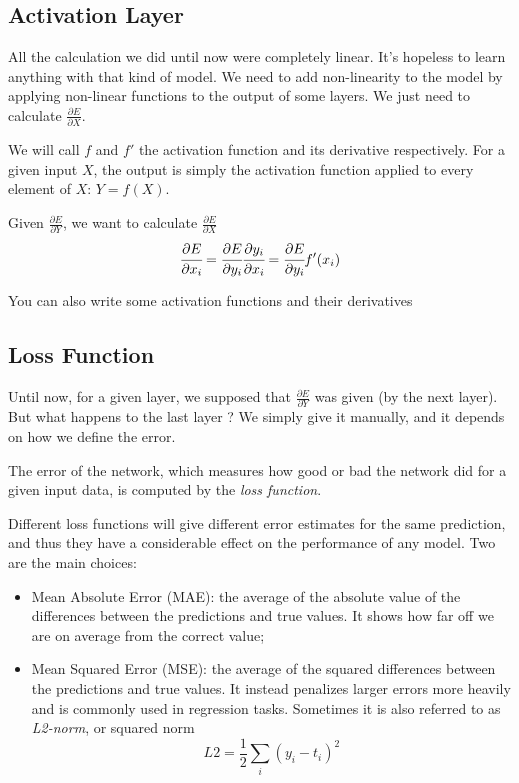 \subsection{Activation Layer}
All the calculation we did until now were completely linear. It's hopeless to learn anything with that kind of model. We need to add non-linearity to the model by applying non-linear functions to the output of some layers. We just need to calculate $\frac{\partial E}{\partial X}$.

We will call $f$ and $f'$ the activation function and its derivative respectively. For a given input $X$, the output is simply the activation function applied to every element of $X$: $Y = f(X)$. 

Given $\frac{\partial E}{\partial Y}$, we want to calculate $\frac{\partial E}{\partial X}$
\begin{equation}
	\cfrac{\partial E}{\partial x_i} = \cfrac{\partial E}{\partial y_i}\cfrac{\partial y_i}{\partial x_i} = \cfrac{\partial E}{\partial y_i} f'(x_i) 
\end{equation}


You can also write some activation functions and their derivatives


\subsection{Loss Function}
Until now, for a given layer, we supposed that $\frac{\partial E}{\partial Y}$ was given (by the next layer). But what happens to the last layer ? We simply give it manually, and it depends on how we define the error.


The error of the network, which measures how good or bad the network did for a given input data, is computed by the \emph{loss function}.

Different loss functions will give different error estimates for the same prediction, and thus they have a considerable effect on the performance of any model. Two are the main choices:

\begin{itemize}
	\tightlist
	\item Mean Absolute Error (MAE): the average of the absolute value of the differences between the predictions and true values. It shows how far off we are on average from the correct value;
	\item Mean Squared Error (MSE): the average of the squared differences between the predictions and true values. It instead penalizes larger errors more heavily and is commonly used in regression tasks. Sometimes it is also referred to as \emph{L2-norm}, or squared norm
	\begin{equation}
		L2 = \frac{1}{2}\sum_i (y_i - t_i)^2
	\end{equation} 
\end{itemize}

